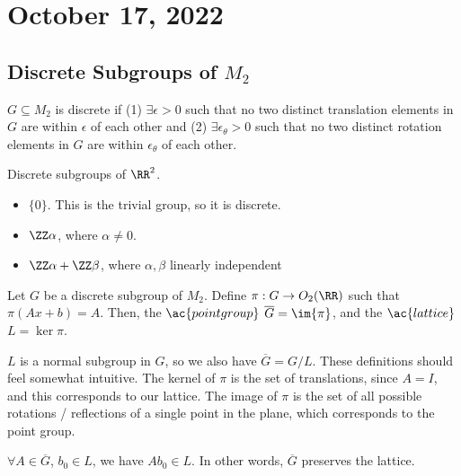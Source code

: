 \section{October 17, 2022}
\subsection{Discrete Subgroups of $M_2$}
\begin{definition}

$G\subseteq M_2$ is \ac{discrete} if (1) $\exists \epsilon > 0$ such that no two distinct translation elements in $G$ are within $\epsilon$ of each other and (2) $\exists \epsilon_{\theta} > 0$ such that no two distinct rotation elements in $G$ are within $\epsilon_{\theta}$ of each other.

\end{definition}

\begin{example}
\exlabel

Discrete subgroups of $\RR^2$.
\end{example}

\begin{itemize}
    \item $\{0\}$. This is the trivial group, so it is discrete.
    \item $\ZZ\alpha$, where $\alpha\neq 0$.
    \item $\ZZ\alpha + \ZZ\beta$, where $\alpha,\beta$ linearly independent
\end{itemize}

\begin{definition}

Let $G$ be a discrete subgroup of $M_2$. Define $\pi: G\rightarrow O_2(\RR)$ such that $\pi(Ax+b) = A$. Then, the $\ac{point group}$ $\overline{G} = \im{\pi}$, and the $\ac{lattice}$ $L = \ker{\pi}$. 
\end{definition}

$L$ is a normal subgroup in $G$, so we also have $\overline{G} = G/L$. These definitions should feel somewhat intuitive. The kernel of $\pi$ is the set of translations, since $A=I$, and this corresponds to our lattice. The image of $\pi$ is the set of all possible rotations / reflections of a single point in the plane, which corresponds to the point group. 

\begin{theorem}
\thmlabel

$\forall A\in \overline{G}$, $b_0\in L$, we have $Ab_0\in L$. In other words, $\overline{G}$ preserves the lattice. 
\end{theorem}

